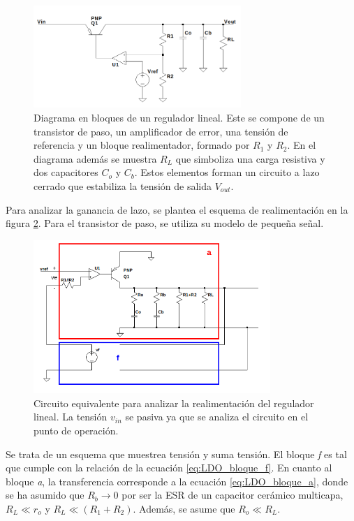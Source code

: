 \begin{figure}[H]
    \centering
    \includegraphics[width=0.7\textwidth]{img/LDO_diagrama_bloques.png}
    \caption{Diagrama en bloques de un regulador lineal. Este se compone de un transistor de paso, un amplificador de error, una tensión de referencia y un bloque realimentador, formado por $R_1$ y $R_2$. En el diagrama además se muestra $R_L$ que simboliza una carga resistiva y dos capacitores $C_o$ y $C_b$. Estos elementos forman un circuito a lazo cerrado que estabiliza la tensión de salida $V_{out}$.}
    \label{fig:LDO_diagrama_bloques}    
\end{figure}

Para analizar la ganancia de lazo, se plantea el esquema de realimentación en la figura \ref{fig:LDO_esquema_realimentacion}. Para el transistor de paso, se utiliza su modelo de pequeña señal. 

\begin{figure}[H]
    \centering
    \includegraphics[width=0.8\textwidth]{img/LDO_esquema_realimentacion.png}
    \caption{Circuito equivalente para analizar la realimentación del regulador lineal. La tensión $v_{in}$ se pasiva ya que se analiza el circuito en el punto de operación.}
    \label{fig:LDO_esquema_realimentacion}    
\end{figure}

Se trata de un esquema que muestrea tensión y suma tensión. El bloque \textit{f} es tal que cumple con la relación de la ecuación \eqref{eq:LDO_bloque_f}. En cuanto al bloque \textit{a}, la transferencia corresponde a la ecuación \eqref{eq:LDO_bloque_a}, donde se ha asumido que $R_b \rightarrow 0$ por ser la ESR de un capacitor cerámico multicapa, $R_L \ll r_o$ y $R_L \ll (R_1+R_2)$. Además, se asume que $R_o \ll R_L$.

